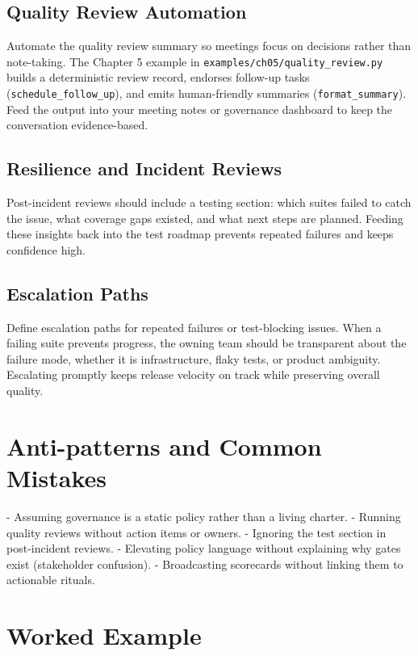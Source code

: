 \subsection{Quality Review Automation}

Automate the quality review summary so meetings focus on decisions rather than note-taking. The Chapter 5 example in \texttt{examples/ch05/quality\_review.py} builds a deterministic review record, endorses follow-up tasks (\texttt{schedule\_follow\_up}), and emits human-friendly summaries (\texttt{format\_summary}). Feed the output into your meeting notes or governance dashboard to keep the conversation evidence-based.

\subsection{Resilience and Incident Reviews}

Post-incident reviews should include a testing section: which suites failed to catch the issue, what coverage gaps existed, and what next steps are planned. Feeding these insights back into the test roadmap prevents repeated failures and keeps confidence high.

\subsection{Escalation Paths}

Define escalation paths for repeated failures or test-blocking issues. When a failing suite prevents progress, the owning team should be transparent about the failure mode, whether it is infrastructure, flaky tests, or product ambiguity. Escalating promptly keeps release velocity on track while preserving overall quality.

\section{Anti-patterns and Common Mistakes}

- Assuming governance is a static policy rather than a living charter.
- Running quality reviews without action items or owners.
- Ignoring the test section in post-incident reviews.
- Elevating policy language without explaining why gates exist (stakeholder confusion).
- Broadcasting scorecards without linking them to actionable rituals.

\section{Worked Example}

